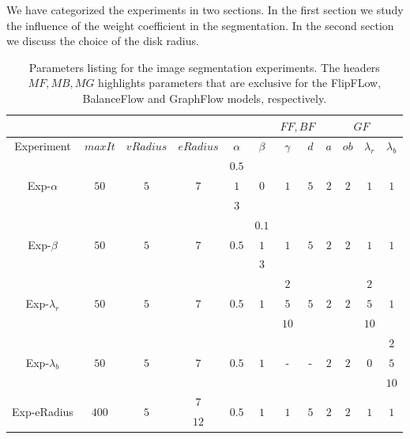 We have categorized the experiments in two sections. In the first section we study the influence of the weight coefficient in the segmentation. In the second section we discuss the choice of the disk radius.


\begin{table}
\centering
\begin{tabular}{|c|c|c|c|c|c|c|c|c|c|c|c|}
\cline{7-12}
\multicolumn{6}{c|}{} & \multicolumn{2}{|c|}{$FF,BF$} & \multicolumn{4}{|c|}{$GF$}\\
\hline
Experiment & $maxIt$ & $vRadius$ & $eRadius$ & $\alpha$ & $\beta$  & $\gamma$ & $d$ & $a$ & $ob$ & $\lambda_r$ & $\lambda_b$ \\
\hline
\multirow{3}{*}{Exp-$\alpha$} & \multirow{3}{*}{$50$} & \multirow{3}{*}{$5$} & \multirow{3}{*}{$7$} & $0.5$ & \multirow{3}{*}{$0$} & \multirow{3}{*}{$1$} & \multirow{3}{*}{$5$} & \multirow{3}{*}{$2$} & \multirow{3}{*}{$2$} & \multirow{3}{*}{$1$} & \multirow{3}{*}{$1$} \\
&  & & & $1$ & & & & & & &\\
&  & & & $3$ & & & & & & &\\
\hline
\multirow{3}{*}{Exp-$\beta$} & \multirow{3}{*}{$50$} & \multirow{3}{*}{$5$} & \multirow{3}{*}{$7$} & \multirow{3}{*}{$0.5$} & $0.1$ & \multirow{3}{*}{$1$} & \multirow{3}{*}{$5$} & \multirow{3}{*}{$2$} & \multirow{3}{*}{$2$} & \multirow{3}{*}{$1$} & \multirow{3}{*}{$1$} \\
&  & & & & $1$ & & & & & &\\
&  & & & & $3$ & & & & & &\\
\hline
\multirow{3}{*}{Exp-$\lambda _r$} & \multirow{3}{*}{$50$} & \multirow{3}{*}{$5$} & \multirow{3}{*}{$7$} & \multirow{3}{*}{$0.5$} & \multirow{3}{*}{$1$} & $2$ & \multirow{3}{*}{$5$} & \multirow{3}{*}{$2$} & \multirow{3}{*}{$2$} & $2$ & \multirow{3}{*}{$1$} \\
&  & & & & & $5$ & & & & $5$ &\\
&  & & & & & $10$ & & & & $10$ &\\
\hline
\multirow{3}{*}{Exp-$\lambda _b$} & \multirow{3}{*}{$50$} & \multirow{3}{*}{$5$} & \multirow{3}{*}{$7$} & \multirow{3}{*}{$0.5$} & \multirow{3}{*}{$1$} & \multirow{3}{*}{-} & \multirow{3}{*}{-} & \multirow{3}{*}{$2$} & \multirow{3}{*}{$2$} & \multirow{3}{*}{$0$} & $2$\\
&  & & & & & & & & & & $5$ \\
&  & & & & & & & & & & $10$\\
\hline
\multirow{2}{*}{Exp-eRadius} & \multirow{2}{*}{$400$} & \multirow{2}{*}{$5$} & $7$ & \multirow{2}{*}{$0.5$} & \multirow{2}{*}{$1$}  & \multirow{2}{*}{$1$}  & \multirow{2}{*}{$5$} & \multirow{2}{*}{$2$} & \multirow{2}{*}{$2$} & \multirow{2}{*}{$1$} & \multirow{2}{*}{$1$} \\
& &  & $12$ &  & &  & &  & & & \\
\hline
\end{tabular}
\caption{Parameters listing for the image segmentation experiments. The headers $MF,MB,MG$ highlights parameters that are exclusive for the FlipFLow, BalanceFlow and GraphFlow models, respectively.}
\label{tab:image-segmentation-parameters-summary}
\end{table}

